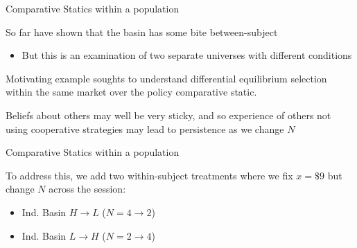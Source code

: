 \documentclass[english]{beamer}
\begin{document}
\begin{frame}{Comparative Statics within a population}
\begin{card}
 So far have shown that the basin has some bite between-subject
        \begin{itemize}
            \item But this is an examination of two separate universes with different conditions
        \end{itemize}
\end{card}
\begin{card}Motivating example soughts to understand differential equilibrium selection within the same market over the policy comparative static.

 Beliefs about others may well be very sticky, and so experience of
        others not using cooperative strategies may lead to persistence as
        we change $N$
\end{card}
       
\end{frame}

\begin{frame}{Comparative Statics within a population}
\begin{card} To address this, we add two within-subject treatments where we fix $x=\$9$ but change $N$ across the session:
        \begin{itemize}
            \item Ind. Basin $H\rightarrow L$ ($N=4\rightarrow 2$)
            \item Ind. Basin $L\rightarrow H$ ($N=2\rightarrow 4$)
        \end{itemize}
    \end{card}
\end{frame}
\end{document}
